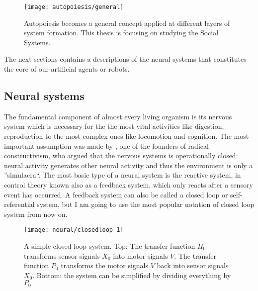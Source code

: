 \begin{figure}[htbp]
\begin{center}
\texttt{[image: autopoiesis/general]}
\end{center}
\small{
\caption[General definition of autopoiesis]{Autopoiesis becomes a general
concept applied at different layers of
system formation. This thesis is focusing on studying the Social Systems.
\label{Fig:Autopoiesis:General}}}
\end{figure}

The next sections contains a descriptions of the neural systems that constitutes
the core of our artificial agents or robots.


\subsection{Neural systems \label{Introduction:NeuralSystem}}

The fundamental component of almost every living organism is its nervous system which
 is necessary for the the most vital activities like digestion, reproduction to the 
most complex ones like locomotion and cognition.
The most important assumption was made by \citet{VonFoerster85}, one of the founders of radical constructivism,
 who argued that the nervous systems is operationally closed: neural activity generates 
other neural activity and thus the environment is only a ''simulacra``.
The most basic type of a neural system is the reactive system, in control theory 
known also as a feedback system, which only reacts after a sensory event has occurred.
A feedback system can also be called a closed loop or self-referential system,
but I am going to use the most popular notation of closed loop system from now on.

\begin{figure}[htbp]
\begin{center}
\texttt{[image: neural/closedloop-1]}
\end{center}
\small{
\caption[Closed loop reactive system]{
A simple closed loop system. 
Top: The transfer function $H_0$ transforms sensor signals
$X_0$ into motor signals $V$. The transfer function $P_0$ transforms the motor signals $V$
back into sensor signals $X_0$.
Bottom: the system can be simplified by dividing everything by $P_0$
\label{Fig:Neural:ControlReactive}}}
\end{figure}

